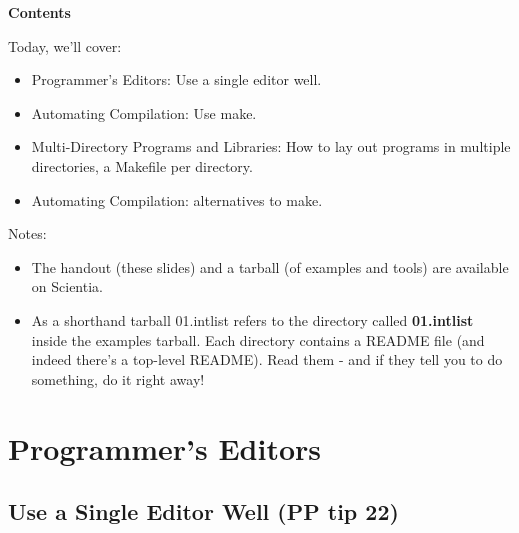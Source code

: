 \documentclass[handout]{beamer}
\newcommand\myheading[1]{%
  \par\bigskip
  {\Large\bfseries#1}\par\smallskip}
\begin{document}
\begin{frame}[fragile]
  \myheading{Contents}
  Today, we'll cover:
      \begin{itemize}
        \item
          \alert{Programmer's Editors:} Use a single editor well.
        \item
	  \alert{Automating Compilation:} Use make.
        \item
   	  \alert{Multi-Directory Programs and Libraries:} How to lay out
	  programs in multiple directories, a Makefile per directory.
        \item
	  \alert{Automating Compilation:} alternatives to make.
	\end{itemize}
    \pause

    Notes:


    \begin{itemize}
    \item
    The handout (these slides) and a tarball (of examples and tools) are available on Scientia.

    \item
    As a shorthand \alert{tarball 01.intlist} refers to the directory
    called {\bf 01.intlist} inside the examples tarball.
    Each directory contains a README file (and indeed there's a top-level README).
    Read them - and if they tell you to do something, do it right away!
    \end{itemize}

\end{frame}



\section{Programmer's Editors}
\subsection{Use a Single Editor Well (PP tip 22)}
\end{document}
